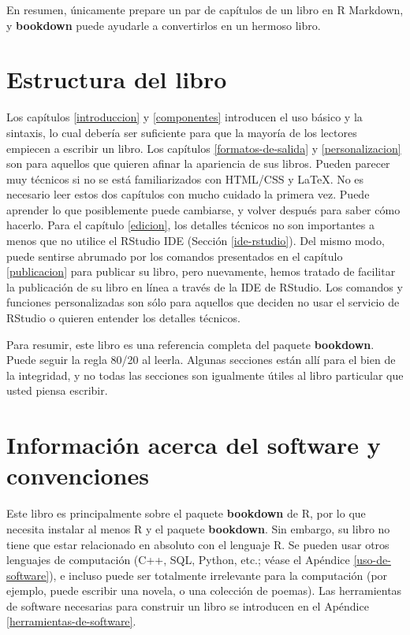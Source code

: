 \documentclass[12pt,]{krantz}
\theoremstyle{definition}
\theoremstyle{definition}
\theoremstyle{definition}
\theoremstyle{remark}
\begin{document}
En resumen, únicamente prepare un par de capítulos de un libro en R
Markdown, y \textbf{bookdown} puede ayudarle a convertirlos en un
hermoso libro.

\section*{Estructura del libro}\label{estructura-del-libro}


Los capítulos \ref{introduccion} y \ref{componentes} introducen el uso
básico y la sintaxis, lo cual debería ser suficiente para que la mayoría
de los lectores empiecen a escribir un libro. Los capítulos
\ref{formatos-de-salida} y \ref{personalizacion} son para aquellos que
quieren afinar la apariencia de sus libros. Pueden parecer muy técnicos
si no se está familiarizados con HTML/CSS y LaTeX. No es necesario leer
estos dos capítulos con mucho cuidado la primera vez. Puede aprender lo
que posiblemente puede cambiarse, y volver después para saber cómo
hacerlo. Para el capítulo \ref{edicion}, los detalles técnicos no son
importantes a menos que no utilice el RStudio IDE (Sección
\ref{ide-rstudio}). Del mismo modo, puede sentirse abrumado por los
comandos presentados en el capítulo \ref{publicacion} para publicar su
libro, pero nuevamente, hemos tratado de facilitar la publicación de su
libro en línea a través de la IDE de RStudio. Los comandos y funciones
personalizadas son sólo para aquellos que deciden no usar el servicio de
RStudio o quieren entender los detalles técnicos.

Para resumir, este libro es una referencia completa del paquete
\textbf{bookdown}. Puede seguir la regla 80/20 al leerla. Algunas
secciones están allí para el bien de la integridad, y no todas las
secciones son igualmente útiles al libro particular que usted piensa
escribir.

\section*{Información acerca del software y
convenciones}\label{informacion-acerca-del-software-y-convenciones}

Este libro es principalmente sobre el paquete \textbf{bookdown} de R,
por lo que necesita instalar al menos R y el paquete \textbf{bookdown}.
Sin embargo, su libro no tiene que estar relacionado en absoluto con el
lenguaje R. Se pueden usar otros lenguajes de computación (C++, SQL,
Python, etc.; véase el Apéndice \ref{uso-de-software}), e incluso puede
ser totalmente irrelevante para la computación (por ejemplo, puede
escribir una novela, o una colección de poemas). Las herramientas de
software necesarias para construir un libro se introducen en el Apéndice
\ref{herramientas-de-software}.
\end{document}
